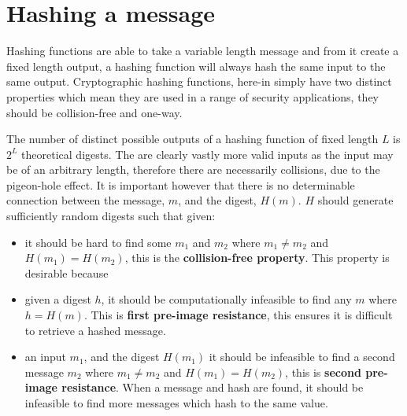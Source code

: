 \documentclass[a4paper,12pt]{article}
\title{}
\author{Jonathan Poulter}
\begin{document}
\maketitle

\begin{abstract}

\end{abstract}



\section{Hashing a message}
Hashing functions are able to take a variable length message and from it create a fixed length output, a hashing function will always hash the same input to the same output. Cryptographic hashing functions, here-in simply  have two distinct properties which mean they are used in a range of security applications, they should be collision-free and one-way.

 The number of distinct possible outputs of a hashing function of fixed length $L$ is $2^L$ theoretical digests. The are clearly vastly more valid inputs as the input may be of an arbitrary length, therefore there are necessarily collisions, due to the pigeon-hole effect. It is important however that there is no determinable connection between the message, $m$, and the digest, $H(m)$. $H$ should generate sufficiently random digests such that given:
\begin{itemize}
  \item it should be hard to find some $m_1$ and $m_2$ where $m_1 \neq m_2$ and $H(m_1) = H(m_2)$, this is the \textbf{collision-free property}. This property is desirable because
  \item given a digest $h$, it should be computationally infeasible to find any $m$ where $h = H(m)$. This is \textbf{first pre-image resistance}, this ensures it is difficult to retrieve a hashed message.
  \item  an input $m_1$, and the digest $H(m_1)$ it should be infeasible to find a second message $m_2$ where $m_1 \neq m_2$ and $H(m_1) = H(m_2)$, this is \textbf{second pre-image resistance}. When a message and hash are found, it should be infeasible to find more messages which hash to the same value.
\end{itemize}
\label{sec:propeties_of_a_hash}
\end{document}
